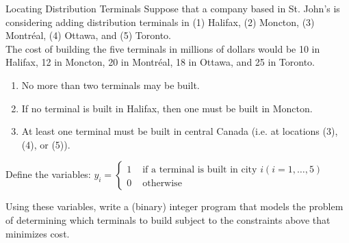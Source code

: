 \begin{ex}{Locating Distribution Terminals}{}
\label{ex:terminals}
Suppose that a company based in St. John's is considering adding distribution terminals in (1) Halifax, (2) Moncton, (3) Montréal, (4) Ottawa, and (5) Toronto.\\

The cost of building the five terminals in millions of dollars would be 10 in Halifax, 12 in Moncton, 20 in Montréal, 18 in Ottawa, and 25 in Toronto. 
\begin{enumerate}
\item No more than two terminals may be built. 
\item If no terminal is built in Halifax, then one must be built in Moncton. 
\item At least one terminal must be built in central Canada (i.e. at locations (3), (4), or (5)).
\end{enumerate}

Define the variables:
$y_{i}= \begin{cases}1 & \text { if a terminal is built in city } i(i=1, \ldots, 5) \\ 0 & \text { otherwise }\end{cases}$

Using these variables, write a (binary) integer program that models the problem of determining which terminals to build subject to the constraints above that minimizes cost.
\exrefs{\S\ref{sec:capital-budgeting}, \S\ref{sec:modeling-tricks}}
\end{ex}

